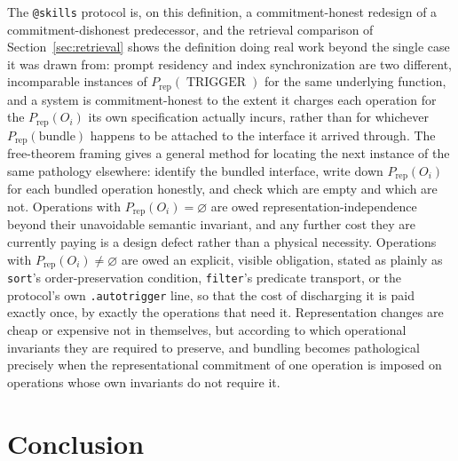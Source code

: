 \documentclass[11pt]{article}
\begin{document}
The \texttt{@skills} protocol is, on this definition, a commitment-honest redesign of a commitment-dishonest predecessor, and the retrieval comparison of Section~\ref{sec:retrieval} shows the definition doing real work beyond the single case it was drawn from: prompt residency and index synchronization are two different, incomparable instances of $P_{\text{rep}}(\operatorname{TRIGGER})$ for the same underlying function, and a system is commitment-honest to the extent it charges each operation for the $P_{\text{rep}}(O_i)$ its own specification actually incurs, rather than for whichever $P_{\text{rep}}(\text{bundle})$ happens to be attached to the interface it arrived through. The free-theorem framing gives a general method for locating the next instance of the same pathology elsewhere: identify the bundled interface, write down $P_{\text{rep}}(O_i)$ for each bundled operation honestly, and check which are empty and which are not. Operations with $P_{\text{rep}}(O_i) = \varnothing$ are owed representation-independence beyond their unavoidable semantic invariant, and any further cost they are currently paying is a design defect rather than a physical necessity. Operations with $P_{\text{rep}}(O_i) \neq \varnothing$ are owed an explicit, visible obligation, stated as plainly as \texttt{sort}'s order-preservation condition, \texttt{filter}'s predicate transport, or the protocol's own \texttt{.autotrigger} line, so that the cost of discharging it is paid exactly once, by exactly the operations that need it. Representation changes are cheap or expensive not in themselves, but according to which operational invariants they are required to preserve, and bundling becomes pathological precisely when the representational commitment of one operation is imposed on operations whose own invariants do not require it.

\section{Conclusion}
\end{document}

